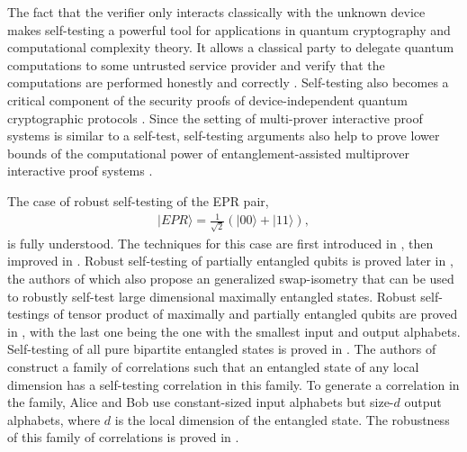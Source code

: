 \documentclass[11pt,letterpaper]{article}
\newcommand{\ket}[1]{|#1\rangle}
\newcommand{\1}{\mathbb{1}}
\theoremstyle{definition}
\begin{document}
The fact that the verifier only interacts classically with the unknown device
makes self-testing a powerful tool 
for applications in 
quantum cryptography and computational
complexity theory.
It allows a classical party to delegate quantum computations to some untrusted service provider
and verify that the computations are performed
honestly and correctly \cite{ruv2013,coladan2017verifier}.
Self-testing also becomes a critical component of the security proofs of device-independent quantum cryptographic protocols
\cite{mayersyao,fu2018}.
Since the setting of multi-prover interactive proof systems is similar to a self-test, self-testing arguments also help to prove
lower bounds of the computational power of entanglement-assisted
multiprover interactive proof systems \cite{fitzsimons2019, neexp}.

The case of robust self-testing of the EPR pair, 
\begin{align*}
    \ket{EPR} = \frac{1}{\sqrt{2}}(\ket{00}+\ket{11}),
\end{align*}
is fully understood.
The techniques for this case are 
first introduced in \cite{mckague2012}, then improved in \cite{bamps2015}. 
Robust self-testing of partially entangled qubits is proved later in
\cite{yang2013}, the authors of which also propose an generalized swap-isometry
that can be used to robustly self-test large dimensional maximally entangled states.
Robust self-testings of tensor product of maximally and partially entangled qubits 
are proved in \cite{coladan2016parallel,natarajan2017,lowdegree},
with the last one being the one with the smallest input and output alphabets.
Self-testing of all pure bipartite entangled states is proved in \cite{coladan2017all}.
The authors of \cite{coladan2017all} construct a family of correlations such
that an entangled state of any local dimension has
a self-testing correlation in this family.
To generate a correlation in the family, Alice and Bob
use constant-sized input alphabets but size-$d$ output alphabets, 
where $d$ is the local dimension of the entangled state. 
The robustness of this family of correlations is proved in \cite{inf_sep}.
\end{document}
